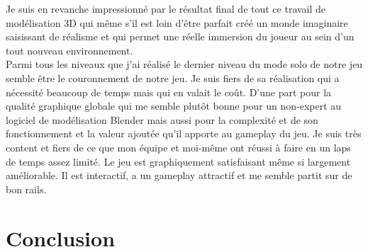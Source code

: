 \documentclass[12pt]{article}
\begin{document}
Je suis en revanche impressionné par le résultat final de tout ce travail de modélisation 3D qui même s’il est loin d’être parfait créé un monde imaginaire saisissant de réalisme et qui permet une réelle immersion du joueur au sein d’un tout nouveau environnement.\\
Parmi tous les niveaux que j’ai réalisé le dernier niveau du mode solo de notre jeu semble être le couronnement de notre jeu. Je suis fiers de sa réalisation qui a nécessité beaucoup de temps mais qui en valait le coût. D’une part pour la qualité graphique globale qui me semble plutôt bonne pour un non-expert au logiciel de modélisation Blender mais aussi pour la complexité et de son fonctionnement et la valeur ajoutée qu’il apporte au gameplay du jeu. 
Je suis très content et fiers de ce que mon équipe et moi-même ont réussi à faire en un laps de temps assez limité. Le jeu est graphiquement satisfaisant même si largement améliorable. Il est interactif, a un gameplay attractif et me semble partit sur de bon rails.




\newpage

\section*{Conclusion}

\newpage

\printglossaries
\end{document}
